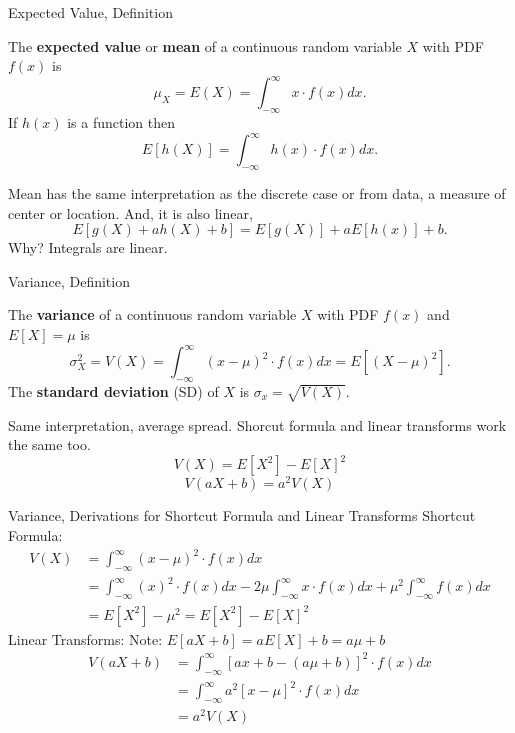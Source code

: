 \documentclass[handout]{beamer}
\begin{document}
\begin{frame}{Expected Value, Definition}
    \begin{block}{}
        The \textbf{expected value} or \textbf{mean} of a continuous random variable $X$ with PDF $f(x)$ is
        $$ \mu_X = E(X) = \int_{-\infty}^\infty x \cdot f(x) dx.$$
        If $h(x)$ is a function then
        $$ E[h(X)] = \int_{-\infty}^\infty h(x) \cdot f(x) dx.$$
    \end{block}
    Mean has the same interpretation as the discrete case or from data, a measure of center or location. And, it is also linear,
    $$ E[g(X) + ah(X) + b] = E[g(X)]+ a E[h(x)] + b.$$
    Why? Integrals are linear.
\end{frame}
\begin{frame}{Variance, Definition}
    \begin{block}{}
        The \textbf{variance} of a continuous random variable $X$ with PDF $f(x)$ and $E[X] = \mu$ is
        $$ \sigma^2_X = V(X) = \int_{-\infty}^\infty (x-\mu)^2 \cdot f(x) dx=E[(X-\mu)^2].$$
        The \textbf{standard deviation} (SD) of $X$ is $\sigma_x = \sqrt{V(X)}$.
    \end{block}
    Same interpretation, average spread. Shorcut formula and linear transforms work the same too.
    $$ V(X) =  E[X^2] - E[X]^2$$
    $$ V(aX +b) = a^2V(X) $$
    \vfill
\end{frame}
\begin{frame}{Variance, Derivations for Shortcut Formula and Linear Transforms}
    Shortcut Formula:
    \begin{align*}
        V(X) & = \int_{-\infty}^\infty (x-\mu)^2 \cdot f(x) dx \\
        &= \int_{-\infty}^\infty (x)^2 \cdot f(x) dx -2 \mu \int_{-\infty}^\infty x \cdot f(x) dx + \mu^2 \int_{-\infty}^\infty  f(x) dx\\
        &= E[X^2] - \mu^2 = E[X^2] - E[X]^2
    \end{align*}
    Linear Transforms:
    Note: $E[aX + b] = aE[X] + b = a\mu +b$
    \begin{align*}
        V(aX + b) & = \int_{-\infty}^\infty [ax+b -(a\mu+b)]^2 \cdot f(x) dx \\
        &= \int_{-\infty}^\infty a^2 [x-\mu]^2 \cdot f(x) dx \\
        &= a^2 V(X)\\
    \end{align*}
\end{frame}
\end{document}
